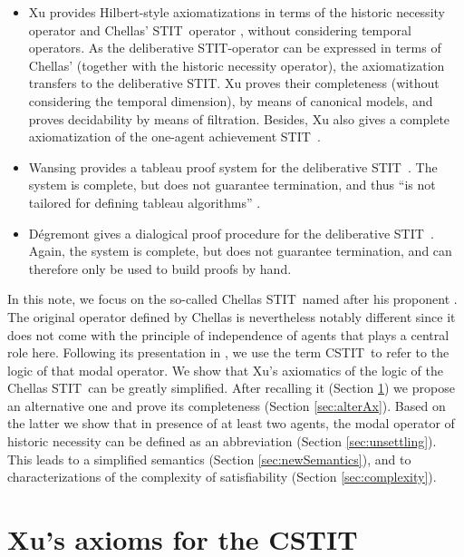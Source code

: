 \documentclass{article}
\newcommand{\STIT} {{\textsf{STIT}}}              \newcommand{\CSTIT}{{\textsf{CSTIT}}}            \newcommand{\DSTIT}{{\textsf{DSTIT}}}
\begin{document}
\begin{itemize}
\item Xu provides Hilbert-style axiomatizations in terms of
the historic necessity operator and Chellas' \STIT\ operator
\cite[Chap.\ 17]{belnap01facing},
without considering temporal operators.
As the deliberative \STIT-operator can be expressed in terms of Chellas'
(together with the historic necessity operator),
the axiomatization transfers to the deliberative \STIT.
Xu proves their completeness (without considering the temporal dimension),
by means of canonical models, and proves decidability by means of filtration.
Besides, Xu also gives a complete axiomatization of the one-agent
achievement \STIT\ \cite[Chap.\ 16]{belnap01facing}.

\item Wansing provides a tableau proof system for the deliberative \STIT\ \cite{wansing06aiml}.
The system is complete, but does not guarantee
termination, and thus ``is not tailored for defining tableau
algorithms'' \cite{wansing06aiml}.

\item D\'{e}gremont gives a dialogical proof procedure for the
deliberative \STIT\ \cite{Degremont}. Again, the system is complete,
but does not guarantee termination, and can therefore
only be used to build proofs by hand.
\end{itemize}

In this note, we focus on the so-called Chellas \STIT\ named after his
proponent \cite{chellas69phd, chellas92agency}. The original operator
defined by Chellas is nevertheless notably different since it does not
come with the principle of independence of agents that plays a central
role here. Following its presentation in \cite{horty95deliberative},
we use the term \CSTIT\ to refer to the logic of that modal operator.
We show that Xu's axiomatics of the logic of the Chellas \STIT\ can be
greatly simplified. After recalling it (Section \ref{sec:background})
we propose an alternative one and prove its completeness  (Section \ref{sec:alterAx}).
Based on the latter we show that in presence of at least two agents,
the modal operator of historic necessity
can be defined as an abbreviation (Section \ref{sec:unsettling}).
This leads to a simplified semantics (Section \ref{sec:newSemantics}),
and to characterizations of the complexity of satisfiability
(Section \ref{sec:complexity}).



\section{Xu's axioms for the \CSTIT}
\label{sec:background}
\end{document}
